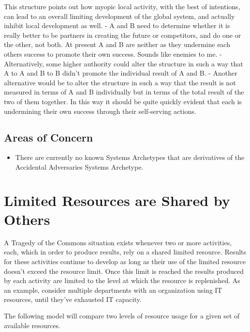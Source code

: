\documentclass[]{memoir}
\begin{document}
This structure points out how myopic local activity, with the best of
intentions, can lead to an overall limiting development of the global
system, and actually inhibit local development as well. - A and B need
to determine whether it is really better to be partners in creating the
future or competitors, and do one or the other, not both. At present A
and B are neither as they undermine each others success to promote their
own success. Sounds like enemies to me. - Alternatively, some higher
authority could alter the structure in such a way that A to A and B to B
didn't promote the individual result of A and B. - Another alternative
would be to alter the structure in such a way that the result is not
measured in terms of A and B individually but in terms of the total
result of the two of them together. In this way it should be quite
quickly evident that each is undermining their own success through their
self-serving actions.

\subsection{Areas of Concern}

\begin{itemize}
\itemsep1pt\parskip0pt
\item
  There are currently no known Systems Archetypes that are derivatives
  of the Accidental Adversaries Systems Archetype.
\end{itemize}

\section{Limited Resources are Shared by Others}

A Tragedy of the Commons situation exists whenever two or more
activities, each, which in order to produce results, rely on a shared
limited resource. Results for these activities continue to develop as
long as their use of the limited resource doesn't exceed the resource
limit. Once this limit is reached the results produced by each activity
are limited to the level at which the resource is replenished. As an
example, consider multiple departments with an organization using IT
resources, until they've exhausted IT capacity.

\FloatBarrier 

\begin{model}[frametitle={Model: Tragedy of the Commons}] 

 The following model will compare two levels of resource usage for a given set of available resources.




 \end{model}
\end{document}
